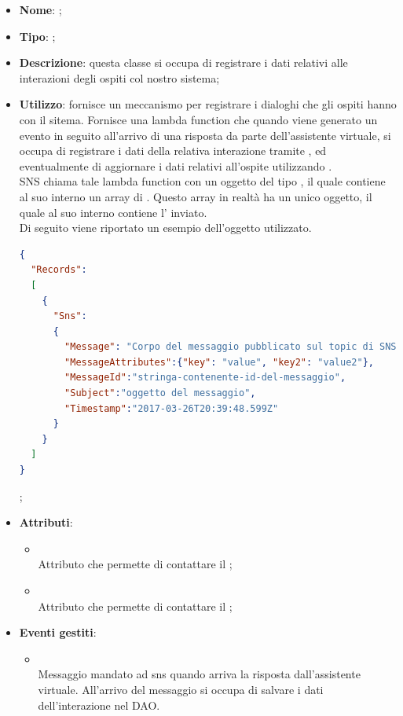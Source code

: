 \begin{itemize}
	\item \textbf{Nome}: ;
	\item \textbf{Tipo}: ;
	\item \textbf{Descrizione}: questa classe si occupa di registrare i dati relativi alle interazioni degli ospiti col nostro sistema;
	\item \textbf{Utilizzo}: fornisce un meccanismo per registrare i dialoghi che gli ospiti hanno con il sitema. Fornisce una lambda function che quando viene generato un evento  in seguito all'arrivo di una risposta da parte dell'assistente virtuale, si occupa di registrare i dati della relativa interazione tramite , ed eventualmente di aggiornare i dati relativi all'ospite utilizzando . \\
SNS chiama tale lambda function con un oggetto del tipo , il quale contiene al suo interno un array di . Questo array in realtà ha un unico oggetto, il quale al suo interno contiene l' inviato. \\
Di seguito viene riportato un esempio dell'oggetto utilizzato.
\begin{lstlisting}[language=json,firstnumber=1]
{
  "Records":
  [
    {
      "Sns":
      {
        "Message": "Corpo del messaggio pubblicato sul topic di SNS",
        "MessageAttributes":{"key": "value", "key2": "value2"},
        "MessageId":"stringa-contenente-id-del-messaggio",
        "Subject":"oggetto del messaggio",
        "Timestamp":"2017-03-26T20:39:48.599Z"
      }
    }
  ]
}
\end{lstlisting};
	\item \textbf{Attributi}:
	\begin{itemize}
		\item[]  \\
		Attributo che permette di contattare il ;
		\item[]  \\
		Attributo che permette di contattare il ;
	\end{itemize}
	\item \textbf{Eventi gestiti}:
	\begin{itemize}
\item {} \\ Messaggio mandato ad sns quando arriva la risposta dall'assistente virtuale. All'arrivo del messaggio si occupa di salvare i dati dell'interazione nel DAO.	\end{itemize}
\end{itemize}
\FloatBarrier

